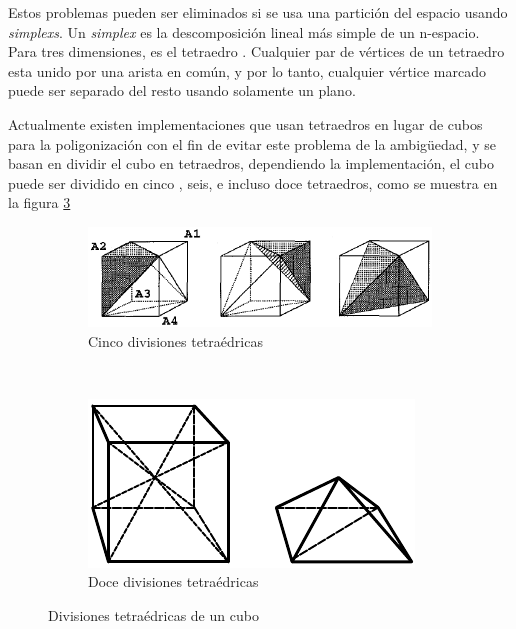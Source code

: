 Estos problemas pueden ser eliminados si se usa una partición del espacio usando \emph{simplexs}.
Un \emph{simplex} es la descomposición lineal más simple de un n-espacio. Para tres dimensiones, es el tetraedro \cite{Bloomenthal88polygonizationof}. Cualquier par de vértices de un tetraedro esta unido por una arista en común, y por lo tanto, cualquier vértice marcado puede ser separado del resto usando solamente un plano.

Actualmente existen implementaciones que usan tetraedros en lugar de cubos para la poligonización con el fin de evitar este problema de la ambigüedad, y se basan en dividir el cubo en tetraedros, dependiendo la implementación, el cubo puede ser dividido en cinco \cite{BAPayne90surfacemapping}, seis, e incluso doce \cite{Bloomenthal88polygonizationof} tetraedros, como se muestra en la figura \ref{f:estadoDelArte:divisionesTetraedricasDeUnCubo}

\begin{figure}[h]

	\begin{subfigure}[b]{0.45\textwidth}
		\centering
		\includegraphics[width=\textwidth]{images/marchingcubes/GueziecHummel95exploitingtriangulated_1.png}
		\caption{Cinco divisiones tetraédricas}
		\label{f:estadoDelArte:cincoDivisionesTetraedricas}
	\end{subfigure}
	~
	\begin{subfigure}[b]{0.45\textwidth}
		\centering
		\includegraphics[width=\textwidth]{images/marchingcubes/Bloomenthal88polygonizationof_2.png}
		\caption{Doce divisiones tetraédricas}
		\label{f:estadoDelArte:doceDivisionesTetraedricas}
	\end{subfigure}

	\caption{Divisiones tetraédricas de un cubo}
	\label{f:estadoDelArte:divisionesTetraedricasDeUnCubo}
\end{figure}

